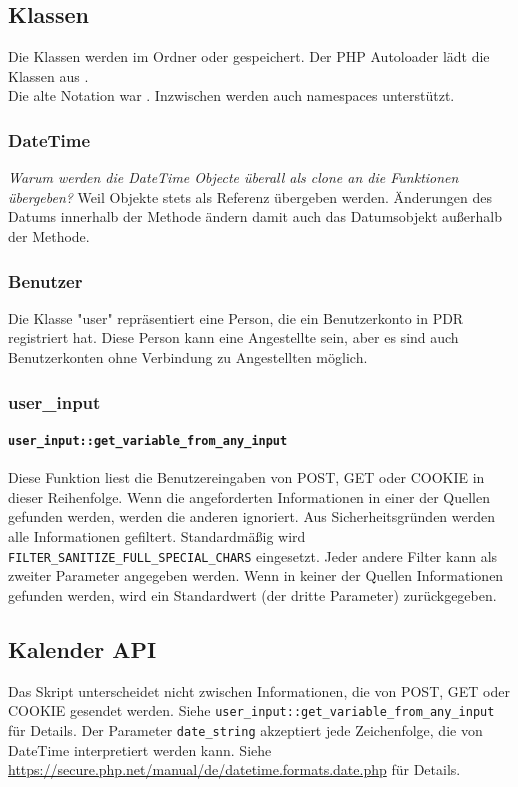 \subsection{Klassen}
Die Klassen werden im Ordner  oder
 gespeichert. Der PHP Autoloader lädt die Klassen
aus . 
\\Die alte Notation war .
Inzwischen werden auch namespaces unterstützt. 

\subsubsection{DateTime}
\emph{Warum werden die DateTime Objecte überall als clone an die Funktionen übergeben?}
Weil Objekte stets als Referenz übergeben werden.
Änderungen des Datums innerhalb der Methode ändern damit auch das Datumsobjekt außerhalb der Methode.


\subsubsection{Benutzer}
Die Klasse "user" repräsentiert eine Person, die ein Benutzerkonto in PDR registriert hat. Diese Person kann eine Angestellte sein, aber es sind auch Benutzerkonten ohne Verbindung zu Angestellten möglich.

\subsubsection{user\_input}
\paragraph{\lstinline|user_input::get_variable_from_any_input|}
Diese Funktion liest die Benutzereingaben von POST, GET oder COOKIE in
dieser Reihenfolge. Wenn die angeforderten Informationen in einer der Quellen
gefunden werden, werden die anderen ignoriert. Aus Sicherheitsgründen werden
alle Informationen gefiltert. Standardmäßig wird
\lstinline|FILTER_SANITIZE_FULL_SPECIAL_CHARS| eingesetzt. Jeder andere Filter kann als
zweiter Parameter angegeben werden. Wenn in keiner der Quellen Informationen
gefunden werden, wird ein Standardwert (der dritte Parameter) zurückgegeben.



\subsection{Kalender API}
Das Skript unterscheidet nicht zwischen Informationen, die von POST, GET
oder COOKIE gesendet werden. Siehe
\lstinline|user_input::get_variable_from_any_input| für Details. Der
Parameter \lstinline|date_string| akzeptiert jede Zeichenfolge, die von
DateTime interpretiert werden kann. Siehe
\url{https://secure.php.net/manual/de/datetime.formats.date.php} für
Details.


